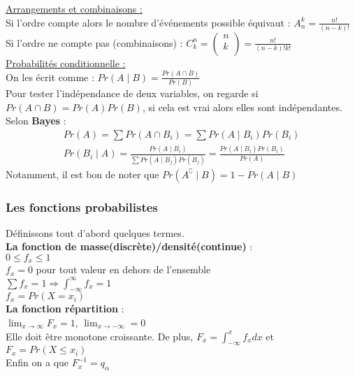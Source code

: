 \documentclass[../main.tex]{subfiles}
\begin{document}
\quad \underline{Arrangements et combinaisons :}\\
Si l'ordre compte alors le nombre d'événements possible équivaut : $A_n^k = \frac{n!}{(n-k)!}$\\
Si l'ordre ne compte pas (combinaisons) : $C_k^n = \begin{pmatrix} n\\
k\\
\end{pmatrix} = \frac{n!}{(n-k)! k!}$\\

\quad \underline{Probabilités conditionnelle :}\\
On les écrit comme : $Pr(A\mid B) = \frac{Pr(A\cap B)}{Pr(B)}$\\
Pour tester l'indépendance de deux variables, on regarde si $Pr(A\cap B) = Pr(A)Pr(B)$, si cela est vrai alors elles sont indépendantes.\\

Selon \textbf{Bayes} : \\
\begin{equation}
    \begin{split}
        Pr(A) = \sum Pr(A\cap B_i) = \sum Pr(A\mid B_i) Pr(B_i)\\
        Pr(B_i\mid A) = \frac{Pr(A\mid B_i)}{\sum Pr(A\mid B_j) Pr(B_j)} = \frac{Pr(A\mid B_i) Pr(B_i)}{Pr(A)}
    \end{split}
\end{equation}
Notamment, il est bon de noter que $Pr(A^\complement \mid B) = 1-Pr(A\mid B)$\\

\subsubsection{Les fonctions probabilistes}
Définissons tout d'abord quelques termes.\\
\textbf{La fonction de masse(discrète)/densité(continue)} : \\
$0\leq f_x \leq 1$\\
$f_x = 0$ pour tout valeur en dehors de l'ensemble\\
$\sum f_x = 1 \Rightarrow \int_{-\infty}^{\infty} f_x = 1$\\
$f_x = Pr(X=x_i)$\\

\textbf{La fonction répartition} : \\
$\lim_{x\rightarrow \infty} F_x = 1$, $\lim_{x\rightarrow -\infty} = 0$\\
Elle doit être monotone croissante. De plus, $F_x = \int_{-\infty}^x f_xdx$ et $F_x = Pr(X \leq x_i)$\\
Enfin on a que $F_x^{-1} = q_{\alpha}$\\
\end{document}

